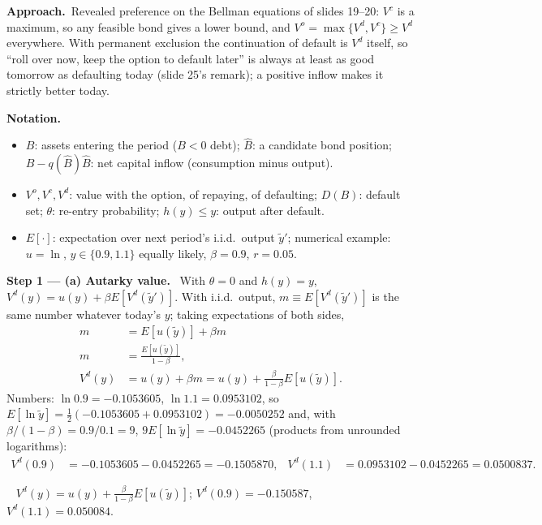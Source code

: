 \documentclass[11pt,a4paper]{article}
\newcommand{\notation}{\par\noindent\textbf{Notation.}}
\newcommand{\step}[2]{\par\medskip\noindent\textbf{Step #1 --- #2.}~}
\newcommand{\approach}{\par\smallskip\noindent\textbf{Approach.}~}
\newcommand{\answer}[1]{\par\smallskip\noindent\fbox{\textbf{Answer #1.}}~}
\begin{document}
\approach Revealed preference on the Bellman equations of slides 19--20: $V^c$ is a maximum, so any feasible bond gives a lower bound, and $V^o=\max\{V^d,V^c\}\ge V^d$
everywhere. With permanent exclusion the continuation of default is $V^d$ itself, so ``roll over now, keep the option to default later'' is always at least as good
tomorrow as defaulting today (slide 25's remark); a positive inflow makes it strictly better today.

\notation
\begin{itemize}
  \item $B$: assets entering the period ($B<0$ debt); $\hat B$: a candidate bond position; $B-q(\hat B)\hat B$: net capital inflow (consumption minus output).
  \item $V^o,V^c,V^d$: value with the option, of repaying, of defaulting; $D(B)$: default set; $\theta$: re-entry probability; $h(y)\le y$: output after default.
  \item $E[\cdot]$: expectation over next period's i.i.d.\ output $\tilde y'$; numerical example: $u=\ln$, $y\in\{0.9,1.1\}$ equally likely, $\beta=0.9$, $r=0.05$.
\end{itemize}

\step{1}{(a) Autarky value} With $\theta=0$ and $h(y)=y$, $V^d(y)=u(y)+\beta E[V^d(\tilde y')]$. With i.i.d.\ output, $m\equiv E[V^d(\tilde y')]$ is the same number
whatever today's $y$; taking expectations of both sides,
\begin{align}
  m &= E[u(\tilde y)] + \beta m \nonumber\\
  m &= \frac{E[u(\tilde y)]}{1-\beta}, \nonumber\\
  V^d(y) &= u(y) + \beta m = u(y) + \frac{\beta}{1-\beta}E[u(\tilde y)]. \label{t5e16-vd}
\end{align}
Numbers: $\ln0.9=-0.1053605$, $\ln1.1=0.0953102$, so $E[\ln\tilde y]=\tfrac12(-0.1053605+0.0953102)=-0.0050252$ and, with $\beta/(1-\beta)=0.9/0.1=9$,
$9E[\ln\tilde y]=-0.0452265$ (products from unrounded logarithms):
\begin{align}
  V^d(0.9) &= -0.1053605-0.0452265 = -0.1505870, & V^d(1.1) &= 0.0953102-0.0452265 = 0.0500837. \nonumber
\end{align}

\answer{(a)} $V^d(y)=u(y)+\frac{\beta}{1-\beta}E[u(\tilde y)]$; $V^d(0.9)=-0.150587$, $V^d(1.1)=0.050084$.
\end{document}
